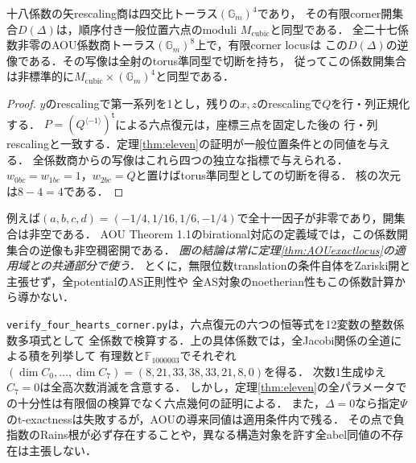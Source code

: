 \begin{corollary}[非空開集合と古典的六点モジュライ]\label{cor:coefficientopen}
十八係数の矢rescaling商は四交比トーラス$(\mathbb G_m)^4$であり，
その有限corner開集合$D(\Delta)$は，順序付き一般位置六点のmoduli $M_{\mathrm{cubic}}$と同型である．
全二十七係数非零のAOU係数商トーラス$(\mathbb G_m)^8$上で，有限corner locusは
この$D(\Delta)$の逆像である．その写像は全射のtorus準同型で切断を持ち，
従ってこの係数開集合は非標準的に$M_{\mathrm{cubic}}\times(\mathbb G_m)^4$と同型である．
\end{corollary}
\begin{proof}
$y$のrescalingで第一系列を1とし，残りの$x,z$のrescalingで$Q$を行・列正規化する．
$P=(Q^{\langle-1\rangle})^{\mathsf t}$による六点復元は，座標三点を固定した後の
行・列rescalingと一致する．定理\ref{thm:eleven}の証明が一般位置条件との同値を与える．
全係数商からの写像はこれら四つの独立な指標で与えられる．
$w_{0bc}=w_{1bc}=1$，$w_{2bc}=Q$と置けばtorus準同型としての切断を得る．
核の次元は$8-4=4$である．
\end{proof}
例えば$(a,b,c,d)=(-1/4,1/16,1/6,-1/4)$で全十一因子が非零であり，開集合は非空である．
AOU Theorem 1.1のbirational対応の定義域では，この係数開集合の逆像も非空稠密開である．
\emph{圏の結論は常に定理\ref{thm:AOUexactlocus}の適用域との共通部分で使う．}
とくに，無限位数translationの条件自体をZariski開と主張せず，全potentialのAS正則性や
全AS対象のnoetherian性もこの係数計算から導かない．

\begin{remark}[検算と適用範囲]
\texttt{verify\_four\_hearts\_corner.py}は，六点復元の六つの恒等式を12変数の整数係数多項式として
全係数で検算する．上の具体係数では，全Jacobi関係の全道による積を列挙して
有理数と$\mathbb F_{1000003}$でそれぞれ
$(\dim C_0,\ldots,\dim C_7)=(8,21,33,38,33,21,8,0)$を得る．
次数1生成ゆえ$C_7=0$は全高次数消滅を含意する．
しかし，定理\ref{thm:eleven}の全パラメータでの十分性は有限個の検算でなく六点幾何の証明による．
また，$\Delta=0$なら指定$\Psi$のt-exactnessは失敗するが，AOUの導来同値は適用条件内で残る．
その点で負指数のRains根が必ず存在することや，異なる構造対象を許す全abel同値の不存在は主張しない．
\end{remark}
